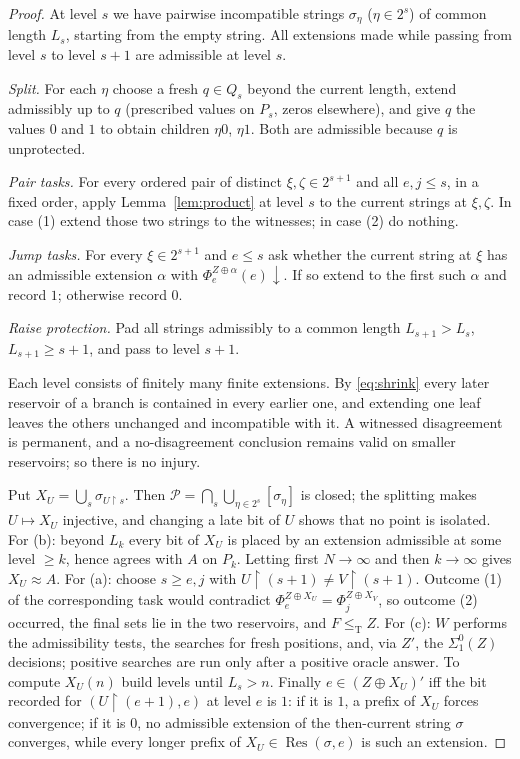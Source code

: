 \documentclass[11pt,letterpaper]{article}
\theoremstyle{definition}
\numberwithin{equation}{section}
\newcommand{\leT}{\le_{\mathrm T}}
\newcommand{\rest}{\mathbin{\upharpoonright}}
\newcommand{\Res}{\operatorname{Res}}
\newcommand{\dn}{{\downarrow}}
\begin{document}
\begin{proof}
At level $s$ we have pairwise incompatible strings $\sigma_\eta$ ($\eta\in2^s$) of common length $L_s$, starting from the empty string. All extensions made while passing from level $s$ to level $s+1$ are admissible at level $s$.

\emph{Split.} For each $\eta$ choose a fresh $q\in Q_s$ beyond the current length, extend admissibly up to $q$ (prescribed values on $P_s$, zeros elsewhere), and give $q$ the values $0$ and $1$ to obtain children $\eta0$, $\eta1$. Both are admissible because $q$ is unprotected.

\emph{Pair tasks.} For every ordered pair of distinct $\xi,\zeta\in2^{s+1}$ and all $e,j\le s$, in a fixed order, apply Lemma~\ref{lem:product} at level $s$ to the current strings at $\xi,\zeta$. In case (1) extend those two strings to the witnesses; in case (2) do nothing.

\emph{Jump tasks.} For every $\xi\in2^{s+1}$ and $e\le s$ ask whether the current string at $\xi$ has an admissible extension $\alpha$ with $\Phi_e^{Z\oplus\alpha}(e)\dn$. If so extend to the first such $\alpha$ and record $1$; otherwise record $0$.

\emph{Raise protection.} Pad all strings admissibly to a common length $L_{s+1}>L_s$, $L_{s+1}\ge s+1$, and pass to level $s+1$.

Each level consists of finitely many finite extensions. By \eqref{eq:shrink} every later reservoir of a branch is contained in every earlier one, and extending one leaf leaves the others unchanged and incompatible with it. A witnessed disagreement is permanent, and a no-disagreement conclusion remains valid on smaller reservoirs; so there is no injury.

Put $X_U=\bigcup_s\sigma_{U\rest s}$. Then $\mathcal P=\bigcap_s\bigcup_{\eta\in2^s}[\sigma_\eta]$ is closed; the splitting makes $U\mapsto X_U$ injective, and changing a late bit of $U$ shows that no point is isolated. For (b): beyond $L_k$ every bit of $X_U$ is placed by an extension admissible at some level $\ge k$, hence agrees with $A$ on $P_k$. Letting first $N\to\infty$ and then $k\to\infty$ gives $X_U\approx A$. For (a): choose $s\ge e,j$ with $U\rest(s+1)\ne V\rest(s+1)$. Outcome (1) of the corresponding task would contradict $\Phi_e^{Z\oplus X_U}=\Phi_j^{Z\oplus X_V}$, so outcome (2) occurred, the final sets lie in the two reservoirs, and $F\leT Z$. For (c): $W$ performs the admissibility tests, the searches for fresh positions, and, via $Z'$, the $\Sigma^0_1(Z)$ decisions; positive searches are run only after a positive oracle answer. To compute $X_U(n)$ build levels until $L_s>n$. Finally $e\in(Z\oplus X_U)'$ iff the bit recorded for $(U\rest(e+1),e)$ at level $e$ is $1$: if it is $1$, a prefix of $X_U$ forces convergence; if it is $0$, no admissible extension of the then-current string $\sigma$ converges, while every longer prefix of $X_U\in\Res(\sigma,e)$ is such an extension.
\end{proof}
\end{document}
